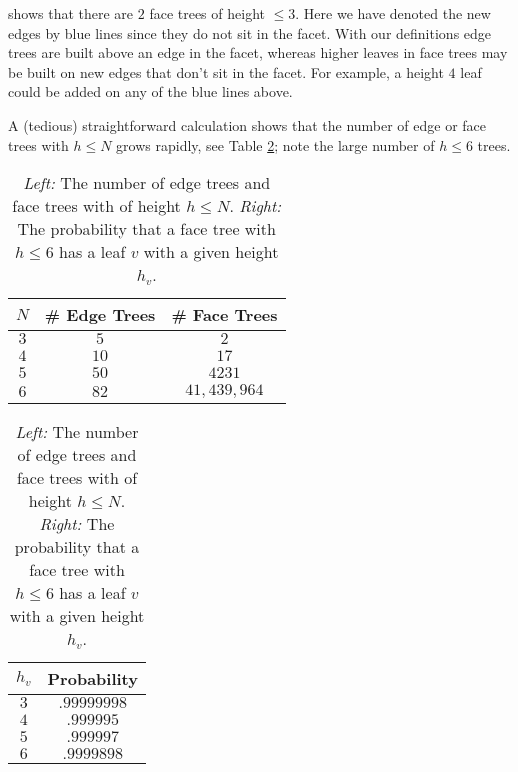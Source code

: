 \documentclass[aps,prl,twocolumn, superscriptaddress,groupedaddress,nofootinbib]{revtex4-1}
\begin{document}
shows that there are $2$ face trees of height $\leq 3$. Here we have denoted the new edges by blue lines since they do
not sit in the facet. With our definitions edge trees are built above an edge
in the facet, whereas higher leaves in face trees may be built on new edges
that don't sit in the facet. For example, a height $4$ leaf could be added
on any of the blue lines above.




A (tedious) straightforward calculation shows that the number of
edge or face trees with $h \leq N$ grows rapidly, see 
Table \ref{tab:numedgefacetreeandprob}; note the large number of $h\leq 6$ trees. 
\begin{table}
\begin{tabular}{|c|c|c|}
\hline
$N$ & \# Edge Trees & \# Face Trees \\ \hline
$3$ & $5$ & $2$\\
$4$ & $10$ & $17$\\
$5$ & $50$ & $4231$ \\
$6$ & $82$ & $41,439,964$\\ \hline
\end{tabular} \hspace{1cm}
\begin{tabular}{|c|c|}
\hline
$h_v$ & Probability \\ \hline
$3$ & $.99999998$ \\
$4$ & $.999995$ \\
$5$ & $.999997$  \\
$6$ & $.9999898$ \\ \hline
\end{tabular}
\caption{\emph{Left:} The number of edge trees and face trees with of height $h\leq N$.
\emph{Right:} The probability that a face tree with $h\leq 6$ has a leaf $v$ with
a given height $h_v$.}
\label{tab:numedgefacetreeandprob}
\end{table}

\end{document}
